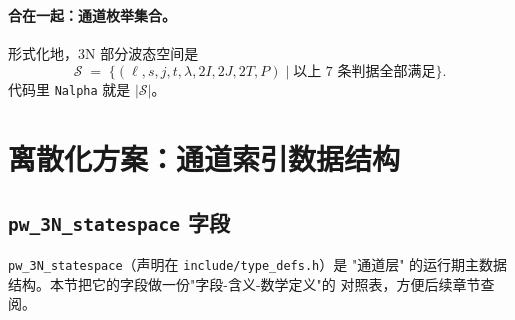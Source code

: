 \paragraph{合在一起：通道枚举集合。}
形式化地，3N 部分波态空间是
\begin{equation}
\label{eq:ch07-state-space-set}
\mathcal{S} \;=\; \big\{
(\ell, s, j, t, \lambda, 2I, 2J, 2T, P)
\;\big|\;
\text{以上 7 条判据全部满足}
\big\}.
\end{equation}
代码里 \texttt{Nalpha} 就是 \(|\mathcal{S}|\)。

\section{离散化方案：通道索引数据结构}
\label{sec:ch07-discretization}

\subsection{\texttt{pw\_3N\_statespace} 字段}
\label{subsec:ch07-statespace-fields}

\texttt{pw\_3N\_statespace}（声明在 \texttt{include/type\_defs.h}）是
"通道层" 的运行期主数据结构。本节把它的字段做一份"字段-含义-数学定义"的
对照表，方便后续章节查阅。

